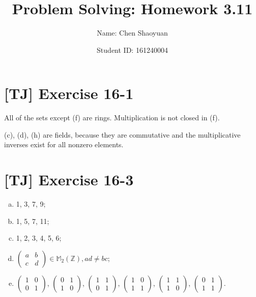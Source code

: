 \documentclass[a4paper,11pt,twocolumn]{article}
\newcommand{\homeworkno}{3.11}
\begin{document}
  \title{Problem Solving: Homework \homeworkno}
  \author{Name: Chen Shaoyuan \and Student ID: 161240004}
  \maketitle

  \section{[TJ] Exercise 16-1}
  All of the sets except (f) are rings. Multiplication is not closed in (f). \par
  (c), (d), (h) are fields, because they are commutative and the multiplicative inverses exist for all nonzero elements.

  \section{[TJ] Exercise 16-3}
  \begin{enumerate}[(a)]
    \item 1, 3, 7, 9;
    \item 1, 5, 7, 11;
    \item 1, 2, 3, 4, 5, 6;
    \item $\begin{pmatrix} a & b \\ c & d \end{pmatrix} \in \mathbb{M}_2(\mathbb{Z}), ad \neq bc$;
    \item $\begin{pmatrix} 1 & 0 \\ 0 & 1 \end{pmatrix}$, $\begin{pmatrix} 0 & 1 \\ 1 & 0 \end{pmatrix}$, $\begin{pmatrix} 1 & 1 \\ 0 & 1 \end{pmatrix}$, $\begin{pmatrix} 1 & 0 \\ 1 & 1 \end{pmatrix}$, $\begin{pmatrix} 1 & 1 \\ 1 & 0 \end{pmatrix}$, $\begin{pmatrix} 0 & 1 \\ 1 & 1 \end{pmatrix}$.
  \end{enumerate}
\end{document}
